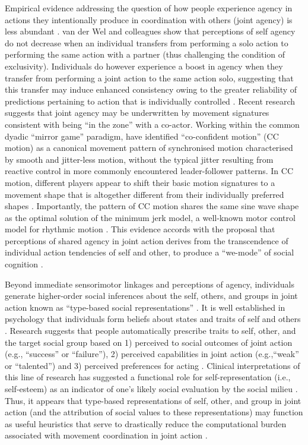 \begin{CJK}{UTF8}{gbsn}
Empirical evidence addressing the question of how people experience agency in actions they intentionally produce in coordination with others (joint agency) is less abundant \citep[but see][]{VanderWel2012,VanderWel2013}. van der Wel and colleagues show that perceptions of self agency do not decrease when an individual transfers from performing a solo action to performing the same action with a partner (thus challenging the condition of exclusivity).  Individuals do however experience a boost in agency when they transfer from performing a joint action to the same action solo, suggesting that this transfer may induce enhanced consistency owing to the greater reliability of predictions pertaining to action that is individually controlled \citep{VanderWel2012}.  Recent research suggests that joint agency may be underwritten by  movement signatures consistent with being ``in the zone'' with a co-actor.  Working within the common dyadic ``mirror game'' paradigm, \textcite{Noy2011,Noy2015,Hart2014} have identified ``co-confident motion'' (CC motion) as a canonical movement pattern of synchronised motion characterised by smooth and jitter-less motion, without the typical jitter resulting from reactive control in more commonly encountered leader-follower patterns.  In CC motion, different players appear to shift their basic motion signatures to a movement shape that is altogether different from their individually preferred shapes \citep{Hart2014}.  Importantly, the pattern of CC motion shares the same sine wave shape as the optimal solution of the minimum jerk model, a well-known motor control model for rhythmic motion \citep{Hogan2007}.  This evidence accords with the proposal that perceptions of shared agency in joint action derives from the transcendence of individual action tendencies of self and other, to produce a ``we-mode'' of social cognition \citep{Gallotti2013}.

Beyond immediate sensorimotor linkages and perceptions of agency,  individuals generate higher-order social inferences about the self, others, and groups in joint action known as ``type-based social representations'' \citep{Moutoussis2014}.  It is well established in psychology that individuals form beliefs about states and traits of self and others \citep{Bem1967,Fowler2006}.  Research suggests that people automatically prescribe traits to self, other, and the target social group based on 1) perceived to social outcomes of joint action (e.g., ``success'' or ``failure''), 2) perceived capabilities in joint action (e.g.,``weak'' or ``talented'') and 3) perceived preferences for acting \citep[e.g., ``good,'' ``fair,'' or ``trustworthy'';][]{Moutoussis2014}.  Clinical interpretations of this line of research has suggested a functional role for self-representation (i.e., self-esteem) as an indicator of one's likely social evaluation by the social milieu \citep{Leary1995}. Thus, it appears that type-based representations of self, other, and group in joint action (and the attribution of social values to these representations) may function as useful heuristics that serve to drastically reduce the computational burden associated with movement coordination in joint action \citep{Moutoussis2011}.


\end{CJK}
